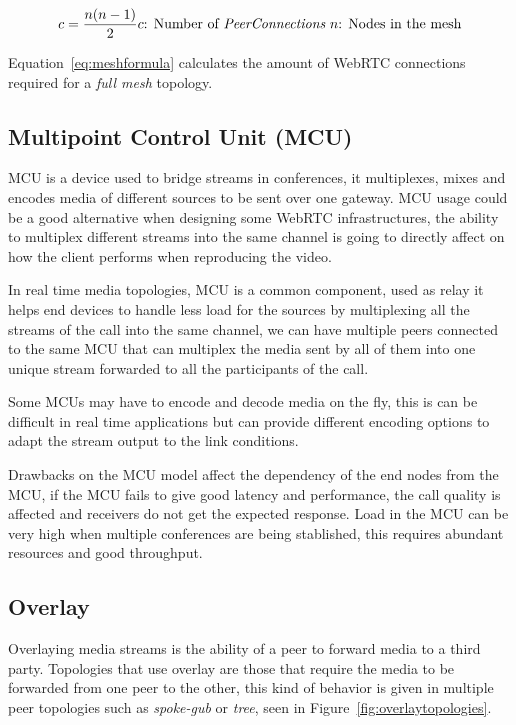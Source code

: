 \begin{equation}
	\label{eq:meshformula}
	c = \frac{n(n-1)}{2}\\
	
	c \text{: Number of {\it PeerConnections}}\
		
	n \text{: Nodes in the mesh}
\end{equation}

Equation~\ref{eq:meshformula} calculates the amount of WebRTC connections required for a {\it full mesh} topology. 

\subsection{Multipoint Control Unit (MCU)}

MCU  is a device used to bridge streams in conferences, it multiplexes, mixes and encodes media of different sources to be sent over one gateway. MCU usage could be a good alternative when designing some WebRTC infrastructures, the ability to multiplex different streams into the same channel is going to directly affect on how the client performs when reproducing the video.

In real time media topologies, MCU is a common component, used as relay it helps end devices to handle less load for the sources by multiplexing all the streams of the call into the same channel, we can have multiple peers connected to the same MCU that can multiplex the media sent by all of them into one unique stream forwarded to all the participants of the call.

Some MCUs may have to encode and decode media on the fly, this is can be difficult in real time applications but can provide different encoding options to adapt the stream output to the link conditions.

Drawbacks on the MCU model affect the dependency of the end nodes from the MCU, if the MCU fails to give good latency and performance, the call quality is affected and receivers do not get the expected response. Load in the MCU can be very high when multiple conferences are being stablished, this requires abundant resources and good throughput.

\subsection{Overlay}

Overlaying media streams is the ability of a peer to forward media to a third party. Topologies that use overlay are those that require the media to be forwarded from one peer to the other, this kind of behavior is given in multiple peer topologies such as {\it spoke-gub} or {\it tree}, seen in Figure~\ref{fig:overlaytopologies}.

